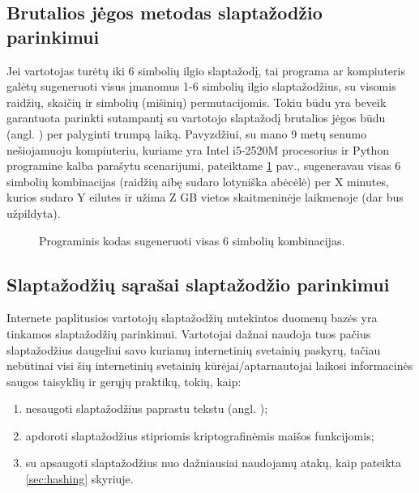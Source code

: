 \documentclass{VUMIFInfBakalaurinis}
\begin{document}
\subsection{Brutalios jėgos metodas slaptažodžio parinkimui} 
\label{sec:bruteforce}
Jei vartotojas turėtų iki 6 simbolių ilgio slaptažodį, tai programa ar 
kompiuteris galėtų sugeneruoti visus įmanomus 1-6 simbolių ilgio slaptažodžius, 
su visomis raidžių, skaičių ir simbolių (mišinių) permutacijomis. Tokiu būdu yra 
beveik garantuota parinkti sutampantį su vartotojo slaptažodį brutalios jėgos 
būdu (angl. ) per palyginti trumpą laiką. Pavyzdžiui, su
mano 9 metų senumo nešiojamuoju kompiuteriu, kuriame yra Intel i5-2520M 
procesorius ir Python programine kalba parašytu scenarijumi, pateiktame 
\ref{fig:kombinacijos} pav., sugeneravau visas 6 simbolių kombinacijas (raidžių 
aibę sudaro lotyniška abėcėlė) per X minutes, kurios sudaro Y eilutes ir užima Z 
GB vietos skaitmeninėje laikmenoje (dar bus užpildyta).

\begin{figure}
  \begin{center}
    
    \caption{Programinis kodas sugeneruoti visas 6 simbolių kombinacijas.}
  \end{center}
  \label{fig:kombinacijos}
\end{figure}

\subsection{Slaptažodžių sąrašai slaptažodžio parinkimui} \label{sec:wordlists}
Internete paplitusios vartotojų slaptažodžių nutekintos duomenų bazės yra 
tinkamos slaptažodžių parinkimui. Vartotojai dažnai naudoja tuos pačius 
slaptažodžius daugeliui savo kuriamų internetinių svetainių paskyrų, tačiau 
nebūtinai visi šių internetinių svetainių kūrėjai/aptarnautojai laikosi
informacinės saugos taisyklių ir gerųjų praktikų, tokių, kaip:
\begin{enumerate}
  \item nesaugoti slaptažodžius paprastu tekstu (angl. );
  \item apdoroti slaptažodžius stipriomis kriptografinėmis maišos funkcijomis;
  \item su  apsaugoti slaptažodžius nuo dažniausiai naudojamų 
        atakų, kaip pateikta \ref{sec:hashing} skyriuje.
\end{enumerate}
\end{document}
